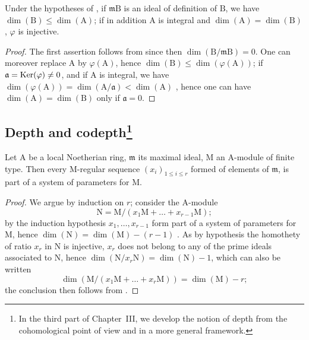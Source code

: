\begin{corollary}[16.3.10]
\label{0.16.3.10}
Under the hypotheses of , if $\mathfrak{m}\mathrm{B}$ is an ideal of definition of $\mathrm{B}$, we have $\dim(\mathrm{B})\leq\dim(\mathrm{A})$; if in addition $\mathrm{A}$ is integral and $\dim(\mathrm{A})=\dim(\mathrm{B})$, $\varphi$ is injective.
\end{corollary}

\begin{proof}
The first assertion follows from  since then $\dim(\mathrm{B}/\mathfrak{m}\mathrm{B})=0$.
One can moreover replace $\mathrm{A}$ by $\varphi(\mathrm{A})$, hence $\dim(\mathrm{B})\leq\dim(\varphi(\mathrm{A}))$; if $\mathfrak{a}=\operatorname{Ker}(\varphi)\neq 0$, and if $\mathrm{A}$ is integral, we have $\dim(\varphi(\mathrm{A}))=\dim(\mathrm{A}/\mathfrak{a})<\dim(\mathrm{A})$ , hence one can have $\dim(\mathrm{A})=\dim(\mathrm{B})$ only if $\mathfrak{a}=0$.
\end{proof}

\subsection[Depth and codepth]{Depth and
codepth\protect\footnote{In the third part of Chapter~III, we develop the
notion of depth from the cohomological point of view and in a more general
framework.}}
\label{subsection:0.16.4}

\begin{proposition}[16.4.1]
\label{0.16.4.1}
Let $\mathrm{A}$ be a local Noetherian ring, $\mathfrak{m}$ its maximal ideal, $\mathrm{M}$ an $\mathrm{A}$-module of finite type.
Then every $\mathrm{M}$-regular sequence $(x_i)_{1\leq i\leq r}$  formed of elements of $\mathfrak{m}$, is part of a system of parameters for $\mathrm{M}$.
\end{proposition}

\begin{proof}
We argue by induction on $r$; consider the $\mathrm{A}$-module
\[
  \mathrm{N}=\mathrm{M}/(x_1\mathrm{M}+\ldots+x_{r-1}\mathrm{M});
\]
by the induction hypothesis $x_1,\ldots,x_{r-1}$ form part of a system of parameters for $\mathrm{M}$, hence $\dim(\mathrm{N})=\dim(\mathrm{M})-(r-1)$ .
As by hypothesis the homothety of ratio $x_r$ in $\mathrm{N}$ is injective, $x_r$ does not belong to any of the prime ideals associated to $\mathrm{N}$, hence  $\dim(\mathrm{N}/x_r\mathrm{N})=\dim(\mathrm{N})-1$, which can also be written
\[
  \dim(\mathrm{M}/(x_1\mathrm{M}+\ldots+x_r\mathrm{M}))=\dim(\mathrm{M})-r;
\]
the conclusion then follows from .
\end{proof}

